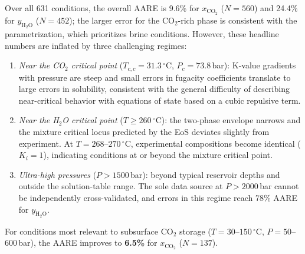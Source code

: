 \documentclass[preprint,12pt,authoryear]{elsarticle}
\begin{document}
Over all 631 conditions, the overall AARE is 9.6\% for $x_{\text{CO}_2}$ ($N = 560$) and
24.4\% for $y_{\text{H}_2\text{O}}$ ($N = 452$); the larger error for the CO$_2$-rich
phase is consistent with the \citet{Coelho2025} parametrization, which prioritizes brine
conditions.
However, these headline numbers are inflated by three challenging regimes:
\begin{enumerate}
  \item \emph{Near the CO$_2$ critical point}
        ($T_{c,c} = 31.3\,^\circ$C, $P_c = 73.8$\,bar): K-value gradients with pressure are
        steep and small errors in fugacity coefficients translate to large errors in solubility,
        consistent with the general difficulty of describing near-critical behavior with
        equations of state based on a cubic repulsive term.
  \item \emph{Near the H$_2$O critical point} ($T \geq 260\,^\circ$C): the two-phase envelope
        narrows and the mixture critical locus predicted by the EoS deviates slightly from experiment.
        At $T = 268$--$270\,^\circ$C, experimental compositions become identical ($K_i = 1$), indicating
        conditions at or beyond the mixture critical point.
  \item \emph{Ultra-high pressures} ($P > 1500$\,bar): beyond typical reservoir depths and
        outside the solution-table range.  The sole data source at $P > 2000$\,bar
        \citep{Todheide1963} cannot be independently cross-validated, and errors in this
        regime reach 78\% AARE for $y_{\text{H}_2\text{O}}$.
\end{enumerate}
For conditions most relevant to subsurface CO$_2$ storage ($T = 30$--$150\,^\circ$C,
$P = 50$--$600$\,bar), the AARE improves to \textbf{6.5\%} for $x_{\text{CO}_2}$ ($N = 137$).
\end{document}
